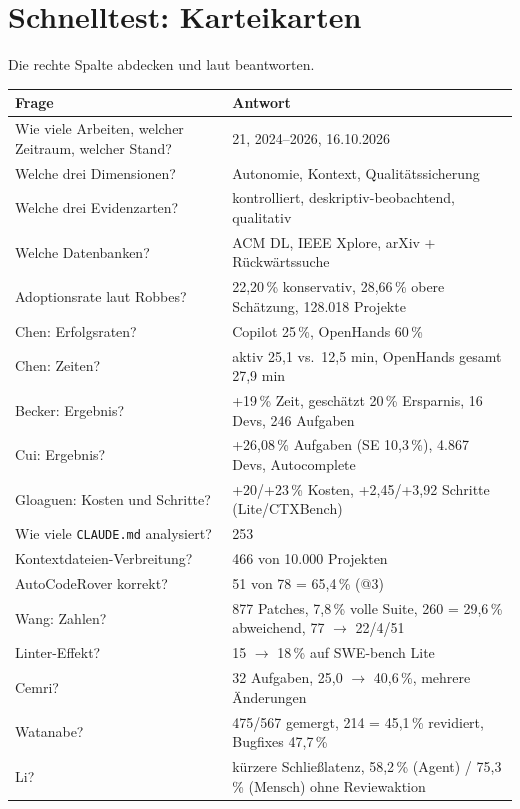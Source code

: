 \documentclass[12pt,a4paper]{article}
\begin{document}
\section{Schnelltest: Karteikarten}
\label{sec:quiz}

Die rechte Spalte abdecken und laut beantworten.

\begin{longtable}{@{}p{8.2cm}p{7.8cm}@{}}
\toprule
\textbf{Frage} & \textbf{Antwort} \\
\midrule
\endhead
Wie viele Arbeiten, welcher Zeitraum, welcher Stand? & 21, 2024--2026, 16.10.2026 \\
Welche drei Dimensionen? & Autonomie, Kontext, Qualitätssicherung \\
Welche drei Evidenzarten? & kontrolliert, deskriptiv-beobachtend, qualitativ \\
Welche Datenbanken? & ACM DL, IEEE Xplore, arXiv + Rückwärtssuche \\
Adoptionsrate laut Robbes? & 22,20\,\% konservativ, 28,66\,\% obere Schätzung, 128.018 Projekte \\
Chen: Erfolgsraten? & Copilot 25\,\%, OpenHands 60\,\% \\
Chen: Zeiten? & aktiv 25,1 vs.\ 12,5 min, OpenHands gesamt 27,9 min \\
Becker: Ergebnis? & +19\,\% Zeit, geschätzt 20\,\% Ersparnis, 16 Devs, 246 Aufgaben \\
Cui: Ergebnis? & +26,08\,\% Aufgaben (SE 10,3\,\%), 4.867 Devs, Autocomplete \\
Gloaguen: Kosten und Schritte? & +20/+23\,\% Kosten, +2,45/+3,92 Schritte (Lite/CTXBench) \\
Wie viele \texttt{CLAUDE.md} analysiert? & 253 \\
Kontextdateien-Verbreitung? & 466 von 10.000 Projekten \\
AutoCodeRover korrekt? & 51 von 78 = 65,4\,\% (@3) \\
Wang: Zahlen? & 877 Patches, 7,8\,\% volle Suite, 260 = 29,6\,\% abweichend, 77 $\to$ 22/4/51 \\
Linter-Effekt? & 15 $\to$ 18\,\% auf SWE-bench Lite \\
Cemri? & 32 Aufgaben, 25,0 $\to$ 40,6\,\%, mehrere Änderungen \\
Watanabe? & 475/567 gemergt, 214 = 45,1\,\% revidiert, Bugfixes 47,7\,\% \\
Li? & kürzere Schließlatenz, 58,2\,\% (Agent) / 75,3\,\% (Mensch) ohne Reviewaktion \\

\end{longtable}
\end{document}
